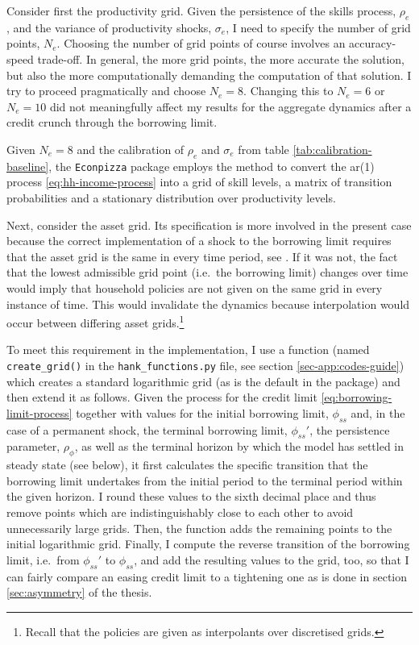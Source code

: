 \documentclass[a4paper,12pt]{article} %
\numberwithin{equation}{section} %
\numberwithin{figure}{section}
\numberwithin{table}{section}
\begin{document}
\begin{refsection}
\begin{appendices}
Consider first the productivity grid. Given the persistence of the skills process, $\rho_e$, and the variance of productivity shocks, $\sigma_e$, I need to specify the number of grid points, $N_e$. Choosing the number of grid points of course involves an accuracy-speed trade-off. In general, the more grid points, the more accurate the solution, but also the more computationally demanding the computation of that solution. I try to proceed pragmatically and choose $N_e = 8$. Changing this to $N_e=6$ or $N_e=10$ did not meaningfully affect my results for the aggregate dynamics after a credit crunch through the borrowing limit. 

Given $N_e = 8$ and the calibration of $\rho_e$ and $\sigma_e$ from table \ref{tab:calibration-baseline}, the \texttt{Econpizza} package employs the \textcite{rouwenhorst1995} method to convert the \Gls{ar}(1) process \eqref{eq:hh-income-process} into a grid of skill levels, a matrix of transition probabilities and a stationary distribution over productivity levels.

Next, consider the asset grid. Its specification is more involved in the present case because the correct implementation of a shock to the borrowing limit requires that the asset grid is the same in every time period, see \textcite{mellior2016mimeo}. If it was not, the fact that the lowest admissible grid point (i.e.~the borrowing limit) changes over time would imply that household policies are not given on the same grid in every instance of time. This would invalidate the dynamics because interpolation would occur between differing asset grids.\footnote{Recall that the policies are given as interpolants over discretised grids.}

To meet this requirement in the implementation, I use a function (named \texttt{create\_grid()} in the \texttt{hank\_functions.py} file, see section \ref{sec-app:codes-guide}) which creates a standard logarithmic grid (as is the default in the package) and then extend it as follows. Given the process for the credit limit \eqref{eq:borrowing-limit-process} together with values for the initial borrowing limit, $\phi_{ss}$ and, in the case of a permanent shock, the terminal borrowing limit, $\phi_{ss}'$, the persistence parameter, $\rho_{\phi}$, as well as the terminal horizon by which the model has settled in steady state (see below), it first calculates the specific transition that the borrowing limit undertakes from the initial period to the terminal period within the given horizon. I round these values to the sixth decimal place and thus remove points which are indistinguishably close to each other to avoid unnecessarily large grids. Then, the function adds the remaining points to the initial logarithmic grid. Finally, I compute the reverse transition of the borrowing limit, i.e.~from $\phi_{ss}'$ to $\phi_{ss}$, and add the resulting values to the grid, too, so that I can fairly compare an easing credit limit to a tightening one as is done in section \ref{sec:asymmetry} of the thesis.


\end{appendices}
\end{refsection}
\end{document}
